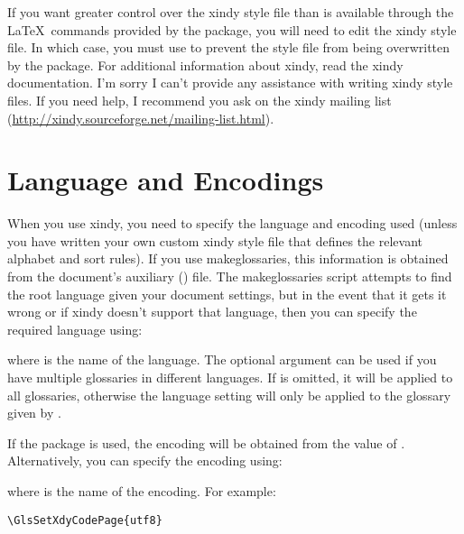 \documentclass[report,inlinetitle]{nlctdoc}
\begin{document}
If you want greater control over the \gls{xindy} style file than is
available through the \LaTeX\ commands provided by the
 package, you will need to edit the \gls*{xindy}
style file. In which case, you must use  to prevent the
style file from being overwritten by the 
package. For additional information about \gls*{xindy}, read the
\gls*{xindy} documentation. I'm sorry I can't provide any assistance
with writing \gls*{xindy} style files. If you need help, I recommend
you ask on the \gls*{xindy} mailing list
(\url{http://xindy.sourceforge.net/mailing-list.html}).

\section{Language and Encodings}
\label{sec:langenc}

When you use \gls{xindy}, you need to specify the language
and encoding used (unless you have written your own custom
\gls*{xindy} style file that defines the relevant alphabet
and sort rules). If you use \gls{makeglossaries},
this information is obtained from the document's auxiliary 
() file.  The \gls{makeglossaries} script attempts to 
find the root language given your document settings, but in the 
event that it gets it wrong or if \gls*{xindy} doesn't support 
that language, then you can specify the required language using:
\begin{definition}[\DescribeMacro{\GlsSetXdyLanguage}]
\end{definition}
where  is the name of the language. The
optional argument can be used if you have multiple glossaries
in different languages. If  is omitted, it
will be applied to all glossaries, otherwise the language
setting will only be applied to the glossary given by
.

If the  package is used, the encoding will be
obtained from the value of . 
Alternatively, you can specify the encoding using:
\begin{definition}[\DescribeMacro{\GlsSetXdyCodePage}]
\end{definition}
where  is the name of the encoding. For example:
\begin{verbatim}
\GlsSetXdyCodePage{utf8}
\end{verbatim}
\end{document}
